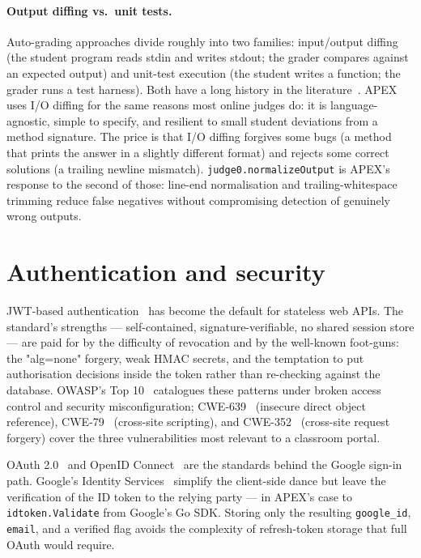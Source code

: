 \paragraph{Output diffing vs.\ unit tests.} Auto-grading approaches divide roughly into two families: input/output diffing (the student program reads stdin and writes stdout; the grader compares against an expected output) and unit-test execution (the student writes a function; the grader runs a test harness). Both have a long history in the literature~\cite{douce2005autoassess,ihantola2010autograding,wasik2018survey}. APEX uses I/O diffing for the same reasons most online judges do: it is language-agnostic, simple to specify, and resilient to small student deviations from a method signature. The price is that I/O diffing forgives some bugs (a method that prints the answer in a slightly different format) and rejects some correct solutions (a trailing newline mismatch). \texttt{judge0.normalizeOutput} is APEX's response to the second of those: line-end normalisation and trailing-whitespace trimming reduce false negatives without compromising detection of genuinely wrong outputs.

\section{Authentication and security}

JWT-based authentication~\cite{rfc7519} has become the default for stateless web APIs. The standard's strengths --- self-contained, signature-verifiable, no shared session store --- are paid for by the difficulty of revocation and by the well-known foot-guns: the "alg=none" forgery, weak HMAC secrets, and the temptation to put authorisation decisions inside the token rather than re-checking against the database. OWASP's Top 10~\cite{owasp-top10} catalogues these patterns under broken access control and security misconfiguration; CWE-639~\cite{cwe-639} (insecure direct object reference), CWE-79~\cite{cwe-79} (cross-site scripting), and CWE-352~\cite{cwe-352} (cross-site request forgery) cover the three vulnerabilities most relevant to a classroom portal.

OAuth 2.0~\cite{rfc6749} and OpenID Connect~\cite{oidc-core} are the standards behind the Google sign-in path. Google's Identity Services~\cite{gids} simplify the client-side dance but leave the verification of the ID token to the relying party --- in APEX's case to \texttt{idtoken.Validate} from Google's Go SDK. Storing only the resulting \texttt{google\_id}, \texttt{email}, and a verified flag avoids the complexity of refresh-token storage that full OAuth would require.

